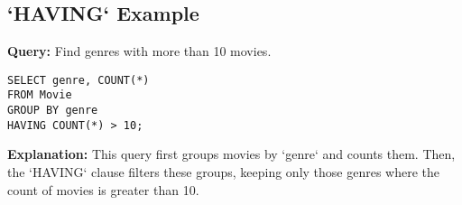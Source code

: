 \documentclass{article}
\begin{document}
\subsection*{`HAVING` Example}
\textbf{Query:} Find genres with more than 10 movies. 
\begin{lstlisting}
SELECT genre, COUNT(*)
FROM Movie
GROUP BY genre
HAVING COUNT(*) > 10;
\end{lstlisting}
\textbf{Explanation:} This query first groups movies by `genre` and counts them. Then, the `HAVING` clause filters these groups, keeping only those genres where the count of movies is greater than 10.
\end{document}
